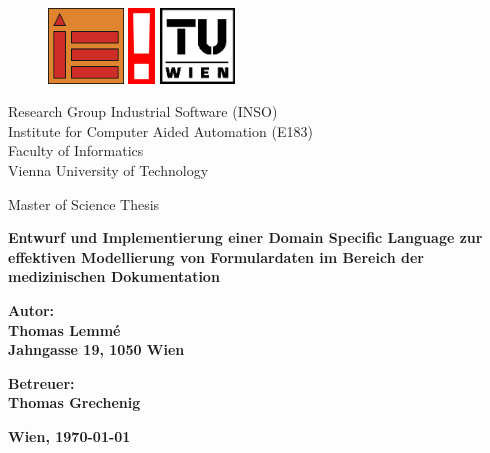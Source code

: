 \pagestyle{empty}

    	\begin{figure}[hp]
				\centering
				\includegraphics[height=20mm, clip]{figures/inso-farbe}
		 	    \hspace{1mm}
		 	    \includegraphics[height=20mm, clip]{figures/info-farbe}
		 	    \hspace{1mm}
					\includegraphics[height=20mm, clip]{figures/tu-dt-teil-schw-pos}
				\label{fig:TU-Wien}
			\end{figure} 
			
\begin{center}
    \Large
    Research Group Industrial Software (INSO)\\
    Institute for Computer Aided Automation (E183)\\
    Faculty of Informatics\\
    Vienna University of Technology\\

\end{center}

\bigskip

\begin{center}
    \Large
    \centering Master of Science Thesis
    \end{center}
    
\bigskip

\begin{center}
    \Huge\bfseries
    Entwurf und Implementierung einer Domain Specific Language zur effektiven Modellierung von Formulardaten im Bereich der medizinischen Dokumentation 
\end{center}

\bigskip

\begin{center}
    \Large\bfseries
    \noindent
    \centering Autor: \\Thomas Lemm\'{e} \\
    Jahngasse 19, 1050 Wien
\end{center}
\bigskip
\begin{center}
    \Large\bfseries
    \noindent
    \centering Betreuer: \\Thomas Grechenig \\
\end{center}
\bigskip
\begin{center}
    \Large\bfseries
    \noindent
    \centering Wien, \today
\end{center}

\vspace*{\fill}

\cleardoublepage

\rmfamily
\normalfont

